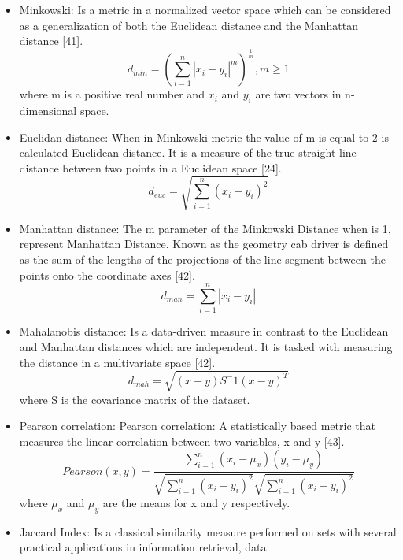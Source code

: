 \documentclass[
]{article}
\providecommand{\tightlist}{%
  \setlength{\itemsep}{0pt}\setlength{\parskip}{0pt}}
\begin{document}
\begin{itemize}
\tightlist
\item
  Minkowski: Is a metric in a normalized vector space which can be
  considered as a generalization of both the Euclidean distance and the
  Manhattan distance {[}41{]}. \begin{equation}
        d_{min} = (\sum_{i=1}^{n}|x_i - y_i|^m)^\frac{1}{m}, m\geq 1
    \end{equation} where m is a positive real number and \(x_i\) and
  \(y_i\) are two vectors in n-dimensional space.
\item
  Euclidan distance: When in Minkowski metric the value of m is equal to
  2 is calculated Euclidean distance. It is a measure of the true
  straight line distance between two points in a Euclidean space
  {[}24{]}. \begin{equation}
        d_{euc} =  \sqrt{\sum_{i=1}^{n}(x_{i}-y_{i})^2}
    \end{equation}
\item
  Manhattan distance: The m parameter of the Minkowski Distance when is
  1, represent Manhattan Distance. Known as the geometry cab driver is
  defined as the sum of the lengths of the projections of the line
  segment between the points onto the coordinate axes {[}42{]}.
  \begin{equation}
        d_{man} =  \sum_{i=1}^{n}|x_{i}-y_{i}|
    \end{equation}
\item
  Mahalanobis distance: Is a data-driven measure in contrast to the
  Euclidean and Manhattan distances which are independent. It is tasked
  with measuring the distance in a multivariate space {[}42{]}.
  \begin{equation}
        d_{mah}= \sqrt{(x-y)S^-1(x-y)^T}
    \end{equation} where S is the covariance matrix of the dataset.
\item
  Pearson correlation: Pearson correlation: A statistically based metric
  that measures the linear correlation between two variables, x and y
  {[}43{]}. \begin{equation}
        Pearson(x,y)= \frac{\sum_{i=1}^n(x_i-\mu_x)(y_i-\mu_y)}{\sqrt{\sum_{i=1}^n(x_i-y_i)^2}\sqrt{\sum_{i=1}^n(x_i-y_i)^2}}
    \end{equation} where \(\mu_x\) and \(\mu_y\) are the means for x and
  y respectively.
\item
  Jaccard Index: Is a classical similarity measure performed on sets
  with several practical applications in information retrieval, data

\end{itemize}
\end{document}
